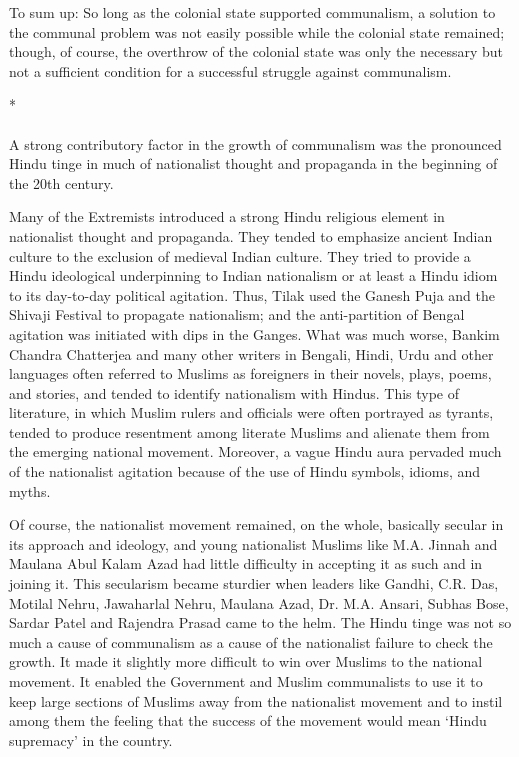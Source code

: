 \begin{multicols}{2}
To sum up: So long as the colonial state supported communalism, a solution to the communal problem was not easily possible while the colonial state remained; though, of course, the overthrow of the colonial state was only the necessary but not a sufficient condition for a successful struggle against communalism.

\begin{center}*\end{center}

\paragraph*{}

A strong contributory factor in the growth of communalism was the pronounced Hindu tinge in much of nationalist thought and propaganda in the beginning of the 20th century. 

Many of the Extremists introduced a strong Hindu religious element in nationalist thought and propaganda. They tended to emphasize ancient Indian culture to the exclusion of medieval Indian culture. They tried to provide a Hindu ideological underpinning to Indian nationalism or at least a Hindu idiom to its day-to-day political agitation. Thus, Tilak used the Ganesh Puja and the Shivaji Festival to propagate nationalism; and the anti-partition of Bengal agitation was initiated with dips in the Ganges. What was much worse, Bankim Chandra Chatterjea and many other writers in Bengali, Hindi, Urdu and other languages often referred to Muslims as foreigners in their novels, plays, poems, and stories, and tended to identify nationalism with Hindus. This type of literature, in which Muslim rulers and officials were often portrayed as tyrants, tended to produce resentment among literate Muslims and alienate them from the emerging national movement. Moreover, a vague Hindu aura pervaded much of the nationalist agitation because of the use of Hindu symbols, idioms, and myths. 

Of course, the nationalist movement remained, on the whole, basically secular in its approach and ideology, and young nationalist Muslims like M.A. Jinnah and Maulana Abul Kalam Azad had little difficulty in accepting it as such and in joining it. This secularism became sturdier when leaders like Gandhi, C.R. Das, Motilal Nehru, Jawaharlal Nehru, Maulana Azad, Dr. M.A. Ansari, Subhas Bose, Sardar Patel and Rajendra Prasad came to the helm. The Hindu tinge was not so much a cause of communalism as a cause of the nationalist failure to check the growth. It made it slightly more difficult to win over Muslims to the national movement. It enabled the Government and Muslim communalists to use it to keep large sections of Muslims away from the nationalist movement and to instil among them the feeling that the success of the movement would mean `Hindu supremacy' in the country. 


\end{multicols}
